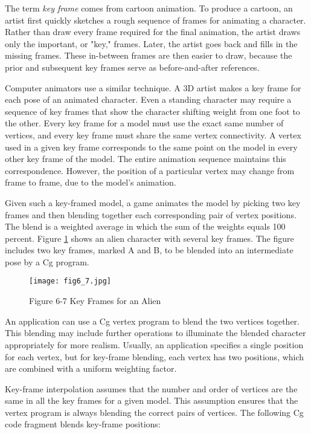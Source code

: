 \documentclass[../main.tex]{subfiles}
\begin{document}
The term \textit{key frame} comes from cartoon animation. To produce a cartoon, an artist first quickly sketches a rough sequence of frames for animating a character. Rather than draw every frame required for the final animation, the artist draws only the important, or "key," frames. Later, the artist goes back and fills in the missing frames. These in-between frames are then easier to draw, because the prior and subsequent key frames serve as before-and-after references.

Computer animators use a similar technique. A 3D artist makes a key frame for each pose of an animated character. Even a standing character may require a sequence of key frames that show the character shifting weight from one foot to the other. Every key frame for a model must use the exact same number of vertices, and every key frame must share the same vertex connectivity. A vertex used in a given key frame corresponds to the same point on the model in every other key frame of the model. The entire animation sequence maintains this correspondence. However, the position of a particular vertex may change from frame to frame, due to the model's animation.

Given such a key-framed model, a game animates the model by picking two key frames and then blending together each corresponding pair of vertex positions. The blend is a weighted average in which the sum of the weights equals 100 percent. Figure \ref{fig:6-7} shows an alien character with several key frames. The figure includes two key frames, marked A and B, to be blended into an intermediate pose by a Cg program.

\begin{figure}
    \centering
    \texttt{[image: fig6\_7.jpg]}
    \caption{Figure 6-7 Key Frames for an Alien}
    \label{fig:6-7}
\end{figure}

An application can use a Cg vertex program to blend the two vertices together. This blending may include further operations to illuminate the blended character appropriately for more realism. Usually, an application specifies a single position for each vertex, but for key-frame blending, each vertex has two positions, which are combined with a uniform weighting factor.

Key-frame interpolation assumes that the number and order of vertices are the same in all the key frames for a given model. This assumption ensures that the vertex program is always blending the correct pairs of vertices. The following Cg code fragment blends key-frame positions:
\end{document}
